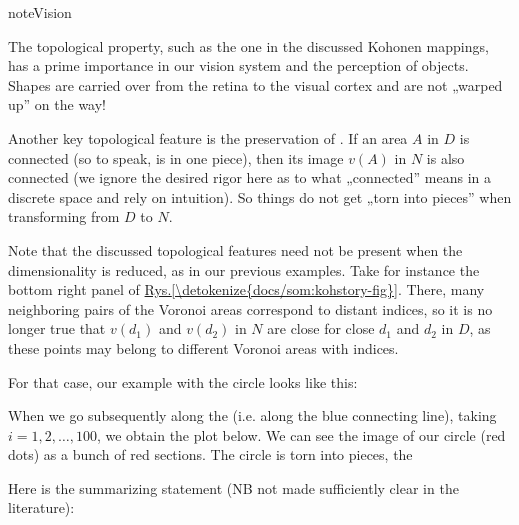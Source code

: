 \documentclass[a4paper,12pt,polish]{jupyterBook}
\begin{document}
\begin{sphinxadmonition}{note}{Vision}

\sphinxAtStartPar
The topological property, such as the one in the discussed Kohonen mappings, has a prime importance in our vision system and the perception of objects. Shapes are carried over from the retina to the visual cortex and are not „warped up” on the way!
\end{sphinxadmonition}

\sphinxAtStartPar
Another key topological feature is the preservation of . If an area \(A\) in \(D\) is connected (so to speak, is in one piece), then its image \(v(A)\) in \(N\) is also connected (we ignore the desired rigor here as to what „connected” means in a discrete space and rely on intuition). So things do not get „torn into pieces” when transforming from \(D\) to \(N\).

\sphinxAtStartPar
Note that the discussed topological features need not be present when the dimensionality is reduced, as in our previous examples. Take for instance the bottom right panel of \hyperref[\detokenize{docs/som:kohstory-fig}]{Rys.\@ \ref{\detokenize{docs/som:kohstory-fig}}}. There, many neighboring pairs of the Voronoi areas correspond to distant indices, so it is no longer true that \(v(d_1)\) and \(v(d_2)\) in \(N\) are close for close \(d_1\) and \(d_2\) in \(D\), as these points may belong to different Voronoi areas with  indices.

\sphinxAtStartPar
For that case, our example with the circle looks like this:
\begin{sphinxVerbatimOutput}

\noindent{}
\end{sphinxVerbatimOutput}

\sphinxAtStartPar
When we go subsequently along the  (i.e. along the blue connecting line), taking \(i=1,2,\dots,100\), we obtain the plot below. We can see the image of our circle (red dots) as a bunch of  red sections. The circle is torn into pieces, the 
\begin{sphinxVerbatimOutput}

\noindent{}
\end{sphinxVerbatimOutput}

\sphinxAtStartPar
Here is the summarizing statement (NB not made sufficiently clear in the literature):
\end{document}
